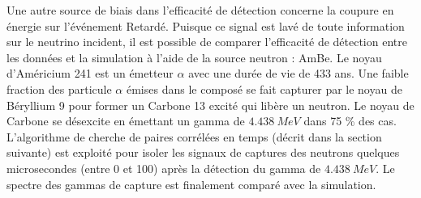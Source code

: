 Une autre source de biais dans l'efficacité de détection concerne la coupure en énergie sur l'événement Retardé. Puisque ce signal est lavé de toute information sur le neutrino incident, il est possible de comparer l'efficacité de détection entre les données et la simulation à l'aide de la source neutron : AmBe. Le noyau d'Américium 241 est un émetteur $\alpha$ avec une durée de vie de 433 ans. Une faible fraction des particule $\alpha$ émises dans le composé se fait capturer par le noyau de Béryllium 9 pour former un Carbone 13 excité qui libère un neutron. Le noyau de Carbone se désexcite en émettant un gamma de $\SI{4.438}{MeV}$ dans 75 \% des cas. L'algorithme de cherche de paires corrélées en temps (décrit dans la section suivante) est exploité pour isoler les signaux de captures des neutrons quelques microsecondes (entre 0 et 100) après la détection du gamma de $\SI{4.438}{MeV}$. Le spectre des gammas de capture est finalement comparé avec la simulation.\\



